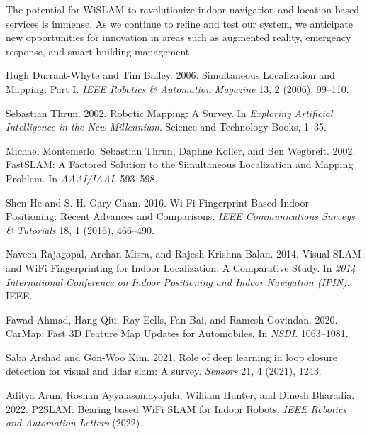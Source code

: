 \documentclass[
	a4paper, %
	11pt, %
	unnumberedsections, %
	twoside, %
]{LTJournalArticle}
\begin{document}
The potential for WiSLAM to revolutionize indoor navigation and location-based services is immense. As we continue to refine and test our system, we anticipate new opportunities for innovation in areas such as augmented reality, emergency response, and smart building management.


\printbibliography %

\begin{thebibliography}{99}

Hugh Durrant-Whyte and Tim Bailey. 2006. Simultaneous Localization and Mapping: Part I. \textit{IEEE Robotics \& Automation Magazine} 13, 2 (2006), 99--110.

Sebastian Thrun. 2002. Robotic Mapping: A Survey. In \textit{Exploring Artificial Intelligence in the New Millennium}. Science and Technology Books, 1--35.

Michael Montemerlo, Sebastian Thrun, Daphne Koller, and Ben Wegbreit. 2002. FastSLAM: A Factored Solution to the Simultaneous Localization and Mapping Problem. In \textit{AAAI/IAAI}. 593--598.

Shen He and S. H. Gary Chan. 2016. Wi-Fi Fingerprint-Based Indoor Positioning: Recent Advances and Comparisons. \textit{IEEE Communications Surveys \& Tutorials} 18, 1 (2016), 466--490.

Naveen Rajagopal, Archan Misra, and Rajesh Krishna Balan. 2014. Visual SLAM and WiFi Fingerprinting for Indoor Localization: A Comparative Study. In \textit{2014 International Conference on Indoor Positioning and Indoor Navigation (IPIN)}. IEEE.

Fawad Ahmad, Hang Qiu, Ray Eells, Fan Bai, and Ramesh Govindan. 2020.
CarMap: Fast 3D Feature Map Updates for Automobiles. In \textit{NSDI}. 1063--1081.

Saba Arshad and Gon-Woo Kim. 2021. Role of deep learning in loop closure
detection for visual and lidar slam: A survey. \textit{Sensors} 21, 4 (2021), 1243.

Aditya Arun, Roshan Ayyalasomayajula, William Hunter, and Dinesh Bharadia.
2022. P2SLAM: Bearing based WiFi SLAM for Indoor Robots. \textit{IEEE Robotics and
Automation Letters} (2022).


\end{thebibliography}
\end{document}
